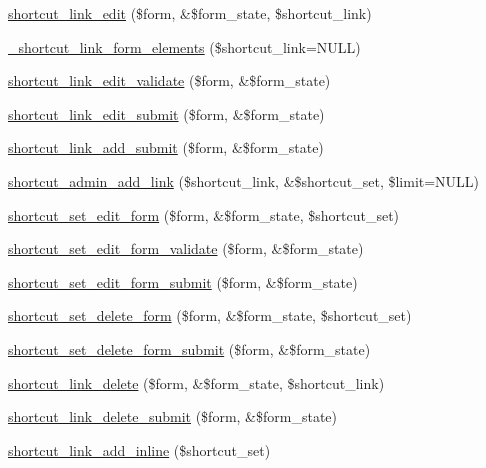 \begin{DoxyCompactItemize}
\item 
\hyperlink{group__forms_gab5cd373d268cb28d52f75cd0309da63c}{shortcut\_\-link\_\-edit} (\$form, \&\$form\_\-state, \$shortcut\_\-link)
\item 
\hyperlink{shortcut_8admin_8inc_a738b105ee9dfcf0a5f642e90d24cfa1f}{\_\-shortcut\_\-link\_\-form\_\-elements} (\$shortcut\_\-link=NULL)
\item 
\hyperlink{shortcut_8admin_8inc_a91ed3ef518afe23ce152c277dc7b99cc}{shortcut\_\-link\_\-edit\_\-validate} (\$form, \&\$form\_\-state)
\item 
\hyperlink{shortcut_8admin_8inc_aacf3899caa37c7ba643625cd50bb7022}{shortcut\_\-link\_\-edit\_\-submit} (\$form, \&\$form\_\-state)
\item 
\hyperlink{shortcut_8admin_8inc_a1fca45432bd8b965324d87062eabf5cd}{shortcut\_\-link\_\-add\_\-submit} (\$form, \&\$form\_\-state)
\item 
\hyperlink{shortcut_8admin_8inc_aa9f17ec07d3f6862a353e7dd0b84c8f4}{shortcut\_\-admin\_\-add\_\-link} (\$shortcut\_\-link, \&\$shortcut\_\-set, \$limit=NULL)
\item 
\hyperlink{group__forms_gaaa9ef77c9928065c19fd0177ecb611b1}{shortcut\_\-set\_\-edit\_\-form} (\$form, \&\$form\_\-state, \$shortcut\_\-set)
\item 
\hyperlink{shortcut_8admin_8inc_ad666de226110fe05591951034928b39d}{shortcut\_\-set\_\-edit\_\-form\_\-validate} (\$form, \&\$form\_\-state)
\item 
\hyperlink{shortcut_8admin_8inc_a0dd86009f508e3643d35aa46d9c454ca}{shortcut\_\-set\_\-edit\_\-form\_\-submit} (\$form, \&\$form\_\-state)
\item 
\hyperlink{group__forms_ga7a58c99b6b77af7fe9a0c954fa63f712}{shortcut\_\-set\_\-delete\_\-form} (\$form, \&\$form\_\-state, \$shortcut\_\-set)
\item 
\hyperlink{shortcut_8admin_8inc_a69d83199a5d74235bb0f46deb5cc0d5b}{shortcut\_\-set\_\-delete\_\-form\_\-submit} (\$form, \&\$form\_\-state)
\item 
\hyperlink{group__forms_ga5a806d89748b578557dbc88fcf0af232}{shortcut\_\-link\_\-delete} (\$form, \&\$form\_\-state, \$shortcut\_\-link)
\item 
\hyperlink{shortcut_8admin_8inc_a3fd35e609a462a9655b912672be3ed4d}{shortcut\_\-link\_\-delete\_\-submit} (\$form, \&\$form\_\-state)
\item 
\hyperlink{shortcut_8admin_8inc_aa3e444869d8ab35d6c6c22ad47430c72}{shortcut\_\-link\_\-add\_\-inline} (\$shortcut\_\-set)
\end{DoxyCompactItemize}


